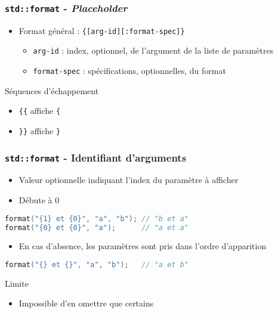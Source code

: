 \documentclass[C++.tex]{subfiles}
\begin{document}
\begin{frame}[fragile]
	\frametitle{\lstinline|std::format| - \textit{Placeholder}}
	\begin{itemize}
		\item Format général : \lstinline|{[arg-id][:format-spec]}|
		\begin{itemize}
			\item \lstinline|arg-id| : index, optionnel, de l'argument de la liste de paramètres
			\item \lstinline|format-spec| : spécifications, optionnelles, du format
		\end{itemize}
	\end{itemize}

	\begin{block}{Séquences d'échappement}
		\begin{itemize}
			\item \lstinline|{{| affiche \lstinline|{|
			\item \lstinline|}}| affiche \lstinline|}|
		\end{itemize}
	\end{block}
\end{frame}

\begin{frame}[fragile]
	\frametitle{\lstinline|std::format| - Identifiant d'arguments}
	\begin{itemize}
		\item Valeur optionnelle indiquant l'index du paramètre à afficher
		\item Débute à 0
	\end{itemize}

	\begin{lstlisting}[language=C++]
format("{1} et {0}", "a", "b"); // "b et a"
format("{0} et {0}", "a");      // "a et a"\end{lstlisting}

	\begin{itemize}
		\item En cas d'absence, les paramètres sont pris dans l'ordre d'apparition
	\end{itemize}

	\begin{lstlisting}[language=C++]
format("{} et {}", "a", "b"); 	// "a et b"\end{lstlisting}

	\begin{alertblock}{Limite}
		\begin{itemize}
			\item Impossible d'en omettre que certains
		\end{itemize}
	\end{alertblock}
\end{frame}
\end{document}
